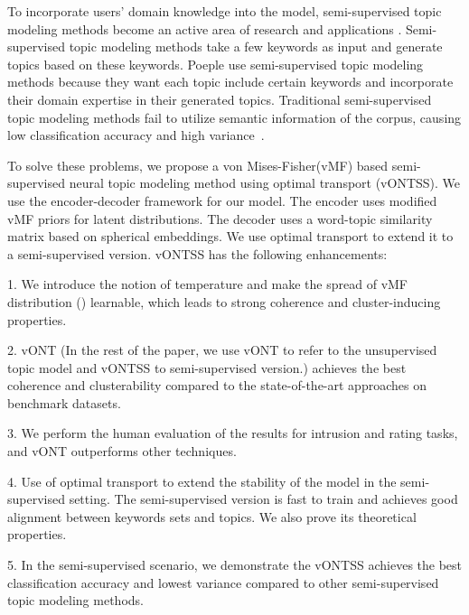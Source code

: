 \documentclass[11pt]{article}
\begin{document}
To incorporate users' domain knowledge into the model, semi-supervised topic modeling methods become an active area of research \cite{mao2012sshlda,jagarlamudi-etal-2012-incorporating, gallagher2018anchored} and applications \cite{choi2017application, cao2019qos,kim2013mining}. Semi-supervised topic modeling methods take a few keywords as input and generate topics based on these keywords. Poeple use semi-supervised topic modeling methods because they want each topic include certain keywords and incorporate their domain expertise in their generated topics.
Traditional semi-supervised topic modeling methods fail to utilize semantic information of the corpus, causing low classification accuracy and high variance~\cite{chiu2022joint}. 





To solve these problems, we propose a von Mises-Fisher(vMF) based semi-supervised neural topic modeling method using optimal transport (vONTSS). We use the encoder-decoder framework for our model. The encoder uses modified vMF priors for latent distributions. The decoder uses a word-topic similarity matrix based on spherical embeddings. We use optimal transport to extend it to a semi-supervised version. vONTSS has the following enhancements:


1. We introduce the notion of temperature and make the spread of vMF distribution () learnable, which leads to strong coherence and cluster-inducing properties.



2. vONT (In the rest of the paper, we use vONT to refer to the unsupervised topic model and vONTSS to semi-supervised version.) achieves the best coherence and clusterability compared to the state-of-the-art approaches on benchmark datasets.

3. We perform the human evaluation of the results for intrusion and rating tasks, and vONT outperforms other techniques.


4. Use of optimal transport to extend the stability of the model in the semi-supervised setting. The semi-supervised version is fast to train and achieves good alignment between keywords sets and topics. We also prove its theoretical properties.










5. In the semi-supervised scenario, we demonstrate the vONTSS achieves the best classification accuracy and lowest variance compared to other semi-supervised topic modeling methods.
\end{document}
